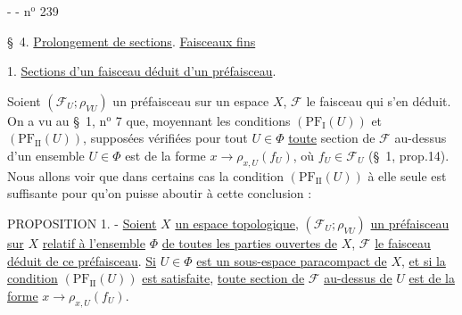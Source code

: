 
-  - \hfill n$^{\mathrm{o}}$ 239

\S\ 4. \uline{Prolongement de sections}. \uline{Faisceaux fins}

1. \uline{Sections d'un faisceau déduit d'un préfaisceau}.

Soient $(\mathcal F_U;\rho_{VU})$ un préfaisceau sur un espace $X$, $\mathcal F$ le faisceau qui s'en déduit. On a vu au \S\ 1, n$^{\mathrm{o}}$ 7 que, moyennant les conditions $(\mathrm{PF}_{\mathrm I}(U))$ et $(\mathrm{PF}_{\mathrm{II}}(U))$, supposées vérifiées pour tout $U\in\Phi$ \uline{toute} section de $\mathcal F$ au-dessus d'un ensemble $U\in\Phi$ est de la forme $x\longrightarrow\rho_{x,U}(f_U)$, où $f_U\in\mathcal F_U$ (\S\ 1, prop.14). Nous allons voir que dans certains cas la condition $(\mathrm{PF}_{\mathrm{II}}(U))$ à elle seule est suffisante pour qu'on puisse aboutir à cette conclusion :

PROPOSITION 1. - \uline{Soient} $X$ \uline{un espace topologique}, $(\mathcal F_U;\rho_{VU})$ \uline{un préfaisceau sur} $X$ \uline{relatif à l'ensemble} $\Phi$ \uline{de toutes les parties ouvertes de} $X$, $\mathcal F$ \uline{le faisceau déduit de ce préfaisceau}. \uline{Si} $U\in\Phi$ \uline{est un sous-espace paracompact de} $X$, \uline{et si la condition} $(\mathrm{PF}_{\mathrm{II}}(U))$ \uline{est satisfaite}, \uline{toute section de} $\mathcal F$ \uline{au-dessus de} $U$ \uline{est de la forme} $x\longrightarrow\rho_{x,U}(f_U)$.

